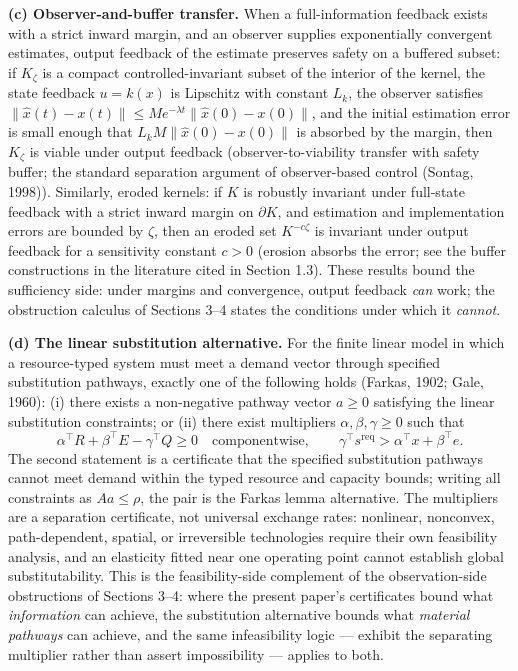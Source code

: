 \documentclass[11pt]{article}
\theoremstyle{definition}
\begin{document}
\textbf{(c) Observer-and-buffer transfer.} When a full-information
feedback exists with a strict inward margin, and an observer supplies
exponentially convergent estimates, output feedback of the estimate
preserves safety on a buffered subset: if \(K_\zeta\) is a compact controlled-invariant subset of the interior of the kernel, the state
feedback \(u = k(x)\) is Lipschitz with constant \(L_k\), the observer satisfies \(\|\hat x(t) - x(t)\| \le M e^{-\lambda t}\|\hat x(0) - x(0)\|\), and
the initial estimation error is small enough that
\(L_k M \|\hat x(0) - x(0)\|\) is absorbed by the margin, then \(K_\zeta\) is viable under output feedback (observer-to-viability
transfer with safety buffer; the standard separation argument of observer-based control (Sontag, 1998)). Similarly, eroded kernels: if \(K\) is robustly
invariant under full-state feedback with a strict inward margin on
\(\partial K\), and estimation and implementation errors are bounded by \(\zeta\), then an eroded set \(K^{-c\zeta}\) is invariant
under output feedback for a sensitivity constant \(c > 0\) (erosion
absorbs the error; see the buffer constructions in the literature cited in Section 1.3). These results bound the sufficiency side: under margins and convergence, output feedback \emph{can} work; the obstruction calculus
of Sections 3--4 states the conditions under which it \emph{cannot}.

\textbf{(d) The linear substitution alternative.} For the finite linear
model in which a resource-typed system must meet a demand vector through specified substitution pathways, exactly one of the following holds
(Farkas, 1902; Gale, 1960): (i) there exists a non-negative pathway
vector \(a \ge 0\) satisfying the linear substitution constraints; or
(ii) there exist multipliers \(\alpha, \beta, \gamma \ge 0\) such that
\[\alpha^\top R + \beta^\top E - \gamma^\top Q \ge 0 \quad\text{componentwise},\qquad \gamma^\top s^{\mathrm{req}} > \alpha^\top x + \beta^\top e.\]
The second statement is a certificate that the specified substitution pathways cannot meet demand within the typed resource and capacity
bounds; writing all constraints as \(Aa \le \rho\), the pair is the Farkas lemma alternative. The multipliers are a separation
certificate, not universal exchange rates: nonlinear, nonconvex,
path-dependent, spatial, or irreversible technologies require their own
feasibility analysis, and an elasticity fitted near one operating point
cannot establish global substitutability. This is the feasibility-side
complement of the observation-side obstructions of Sections 3--4: where
the present paper's certificates bound what \emph{information} can
achieve, the substitution alternative bounds what \emph{material
pathways} can achieve, and the same infeasibility logic --- exhibit the separating multiplier rather than assert impossibility --- applies to both.
\end{document}
